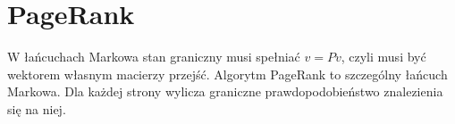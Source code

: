 \section{PageRank}
W łańcuchach Markowa stan graniczny musi spełniać \( v = Pv \), czyli musi być wektorem własnym macierzy przejść. Algorytm PageRank to szczególny łańcuch Markowa. Dla każdej strony wylicza graniczne prawdopodobieństwo znalezienia się na niej.